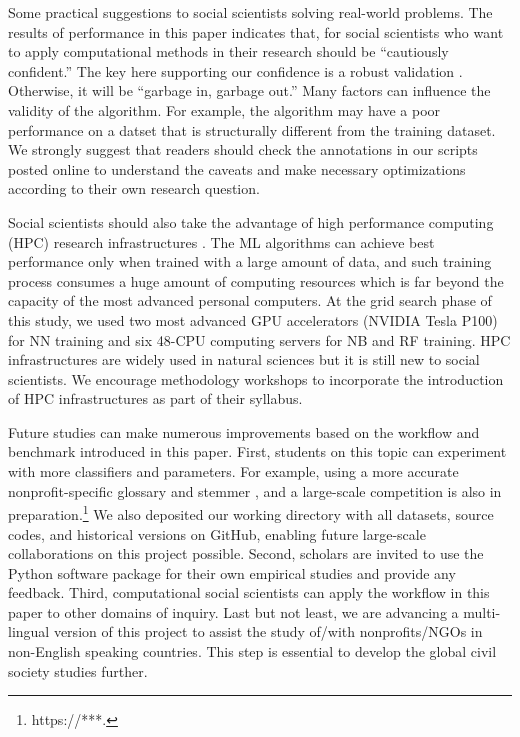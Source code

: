 \documentclass[11pt]{article}
\begin{document}
Some practical suggestions to social scientists solving real-world problems. The results of performance in this paper indicates that, for social scientists who want to apply computational methods in their research should be ``cautiously confident.'' The key here supporting our confidence is a robust validation \parencite[271]{GrimmerTextDataPromise2013}. Otherwise, it will be ``garbage in, garbage out.'' Many factors can influence the validity of the algorithm. For example, the algorithm may have a poor performance on a datset that is structurally different from the training dataset. We strongly suggest that readers should check the annotations in our scripts posted online to understand the caveats and make necessary optimizations according to their own research question.

Social scientists should also take the advantage of high performance computing (HPC) research infrastructures \parencite[e.g.,][]{KeaheyChameleonScalableProduction2018}. The ML algorithms can achieve best performance only when trained with a large amount of data, and such training process consumes a huge amount of computing resources which is far beyond the capacity of the most advanced personal computers. At the grid search phase of this study, we used two most advanced GPU accelerators (NVIDIA Tesla P100) for NN training and six 48-CPU computing servers for NB and RF training. HPC infrastructures are widely used in natural sciences but it is still new to social scientists. We encourage methodology workshops to incorporate the introduction of HPC infrastructures as part of their syllabus.

Future studies can make numerous improvements based on the workflow and benchmark introduced in this paper. First, students on this topic can experiment with more classifiers and parameters. For example, using a more accurate nonprofit-specific glossary and stemmer \parencite{PaxtonNonprofitSpecificGlossaryStemmer2019}, and a large-scale competition is also in preparation.\footnote{https://***.} We also deposited our working directory with all datasets, source codes, and historical versions on GitHub, enabling future large-scale collaborations on this project possible. Second, scholars are invited to use the Python software package for their own empirical studies and provide any feedback. Third, computational social scientists can apply the workflow in this paper to other domains of inquiry. Last but not least, we are advancing a multi-lingual version of this project to assist the study of/with nonprofits/NGOs in non-English speaking countries. This step is essential to develop the global civil society studies further.
\end{document}
